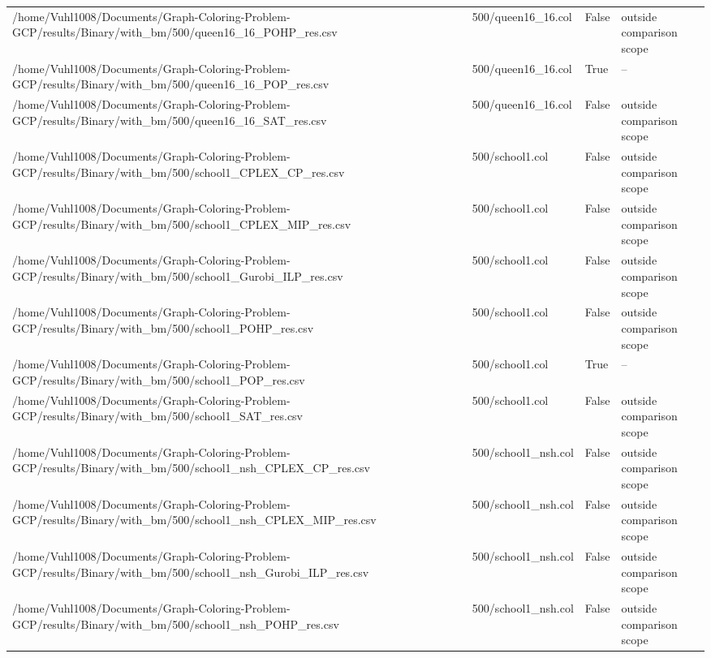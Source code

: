 \begin{table}[htbp]
\begin{tabular}{llll}
/home/Vuhl1008/Documents/Graph-Coloring-Problem-GCP/results/Binary/with\_bm/500/queen16\_16\_POHP\_res.csv & 500/queen16\_16.col & False & outside comparison scope \\
/home/Vuhl1008/Documents/Graph-Coloring-Problem-GCP/results/Binary/with\_bm/500/queen16\_16\_POP\_res.csv & 500/queen16\_16.col & True & -- \\
/home/Vuhl1008/Documents/Graph-Coloring-Problem-GCP/results/Binary/with\_bm/500/queen16\_16\_SAT\_res.csv & 500/queen16\_16.col & False & outside comparison scope \\
/home/Vuhl1008/Documents/Graph-Coloring-Problem-GCP/results/Binary/with\_bm/500/school1\_CPLEX\_CP\_res.csv & 500/school1.col & False & outside comparison scope \\
/home/Vuhl1008/Documents/Graph-Coloring-Problem-GCP/results/Binary/with\_bm/500/school1\_CPLEX\_MIP\_res.csv & 500/school1.col & False & outside comparison scope \\
/home/Vuhl1008/Documents/Graph-Coloring-Problem-GCP/results/Binary/with\_bm/500/school1\_Gurobi\_ILP\_res.csv & 500/school1.col & False & outside comparison scope \\
/home/Vuhl1008/Documents/Graph-Coloring-Problem-GCP/results/Binary/with\_bm/500/school1\_POHP\_res.csv & 500/school1.col & False & outside comparison scope \\
/home/Vuhl1008/Documents/Graph-Coloring-Problem-GCP/results/Binary/with\_bm/500/school1\_POP\_res.csv & 500/school1.col & True & -- \\
/home/Vuhl1008/Documents/Graph-Coloring-Problem-GCP/results/Binary/with\_bm/500/school1\_SAT\_res.csv & 500/school1.col & False & outside comparison scope \\
/home/Vuhl1008/Documents/Graph-Coloring-Problem-GCP/results/Binary/with\_bm/500/school1\_nsh\_CPLEX\_CP\_res.csv & 500/school1\_nsh.col & False & outside comparison scope \\
/home/Vuhl1008/Documents/Graph-Coloring-Problem-GCP/results/Binary/with\_bm/500/school1\_nsh\_CPLEX\_MIP\_res.csv & 500/school1\_nsh.col & False & outside comparison scope \\
/home/Vuhl1008/Documents/Graph-Coloring-Problem-GCP/results/Binary/with\_bm/500/school1\_nsh\_Gurobi\_ILP\_res.csv & 500/school1\_nsh.col & False & outside comparison scope \\
/home/Vuhl1008/Documents/Graph-Coloring-Problem-GCP/results/Binary/with\_bm/500/school1\_nsh\_POHP\_res.csv & 500/school1\_nsh.col & False & outside comparison scope \\

\end{tabular}
\end{table}
